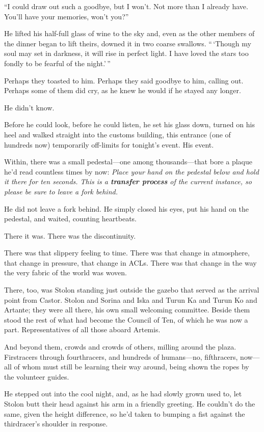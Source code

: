 ``I could draw out such a goodbye, but I won't. Not more than I already have. You'll have your memories, won't you?''

He lifted his half-full glass of wine to the sky and, even as the other members of the dinner began to lift theirs, downed it in two coarse swallows. ``\,`Though my soul may set in darkness, it will rise in perfect light. I have loved the stars too fondly to be fearful of the night.'\,''

Perhaps they toasted to him. Perhaps they said goodbye to him, calling out. Perhaps some of them did cry, as he knew he would if he stayed any longer.

He didn't know.

Before he could look, before he could listen, he set his glass down, turned on his heel and walked straight into the customs building, this entrance (one of hundreds now) temporarily off-limits for tonight's event. His event.

Within, there was a small pedestal—one among thousands—that bore a plaque he'd read countless times by now: \emph{Place your hand on the pedestal below and hold it there for ten seconds. This is a \textbf{transfer process} of the current instance, so please be sure to leave a fork behind.}

He did not leave a fork behind. He simply closed his eyes, put his hand on the pedestal, and waited, counting heartbeats.

There it was. There was the discontinuity.

There was that slippery feeling to time. There was that change in atmosphere, that change in pressure, that change in ACLs. There was that change in the way the very fabric of the world was woven.

There, too, was Stolon standing just outside the gazebo that served as the arrival point from Castor. Stolon and Sorina and Iska and Turun Ka and Turun Ko and Artante; they were all there, his own small welcoming committee. Beside them stood the rest of what had become the Council of Ten, of which he was now a part. Representatives of all those aboard Artemis.

And beyond them, crowds and crowds of others, milling around the plaza. Firstracers through fourthracers, and hundreds of humans—no, fifthracers, now—all of whom must still be learning their way around, being shown the ropes by the volunteer guides.

He stepped out into the cool night, and, as he had slowly grown used to, let Stolon butt their head against his arm in a friendly greeting. He couldn't do the same, given the height difference, so he'd taken to bumping a fist against the thirdracer's shoulder in response.


